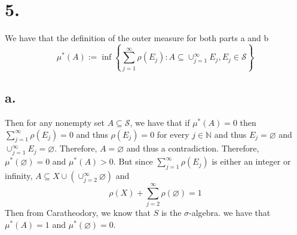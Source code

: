 \documentclass[11pt]{article}
\theoremstyle{mystyle}
\theoremstyle{definition}
\begin{document}
\section*{5.}
We have that the definition of the outer measure for both parts a and b
\[
  \mu^*(A) := \inf \left\{\sum_{j=1}^\infty \rho(E_j): A \subseteq \cup_{j=1}^\infty E_j, E_j \in \mathcal{S} \right\}
\]
\subsection*{a.}
Then for any nonempty set $A \subseteq \mathcal{S}$, we have that if $\mu^*(A) = 0$ then $\sum_{j=1}^\infty \rho(E_j) = 0$ and thus $\rho(E_j) = 0$ for every $j \in \mathbb{N}$ and thus $E_j = \varnothing$ and $\cup_{j=1}^\infty E_j = \varnothing$. Therefore, $A = \varnothing$ and thus a contradiction. Therefore, $\mu^*(\varnothing) = 0$ and $ \mu^*(A) > 0$. But since $\sum_{j=1}^\infty \rho(E_j)$ is either an integer or infinity, $A \subseteq X \cup (\cup_{j=2}^\infty \varnothing)$ and 
\[
  \rho(X) + \sum_{j=2}^\infty \rho(\varnothing) = 1
\]
Then from Caratheodory, we know that $S$ is the $\sigma$-algebra. 
we have that $\mu^*(A) = 1$ and $\mu^*(\varnothing) = 0$. 
\end{document}
